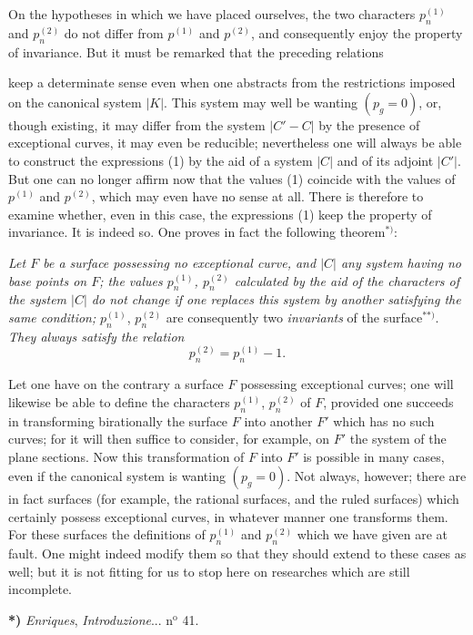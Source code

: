\documentclass{article}
\begin{document}
On the hypotheses in which we have placed ourselves, the two characters $p_{n}^{(1)}$ and $p_{n}^{(2)}$ do not differ from $p^{(1)}$ and $p^{(2)}$, and consequently enjoy the property of invariance. But it must be remarked that the preceding relations

keep a determinate sense even when one abstracts from the restrictions imposed on the canonical system $|K|$. This system may well be wanting $(p_{g} = 0)$, or, though existing, it may differ from the system $|C' - C|$ by the presence of exceptional curves, it may even be reducible; nevertheless one will always be able to construct the expressions (1) by the aid of a system $|C|$ and of its adjoint $|C'|$. But one can no longer affirm now that the values (1) coincide with the values of $p^{(1)}$ and $p^{(2)}$, which may even have no sense at all. There is therefore to examine whether, even in this case, the expressions (1) keep the property of invariance. It is indeed so. One proves in fact the following theorem${}^{*)}$:

\emph{Let $F$ be a surface possessing no exceptional curve, and $|C|$ any system having no base points on $F$; the values $p_{n}^{(1)}$, $p_{n}^{(2)}$ calculated by the aid of the characters of the system $|C|$ do not change if one replaces this system by another satisfying the same condition;} $p_{n}^{(1)}$, $p_{n}^{(2)}$ are consequently two \emph{invariants} of the surface${}^{**)}$. \emph{They always satisfy the relation}
\[
p_{n}^{(2)} = p_{n}^{(1)} - 1.
\]

Let one have on the contrary a surface $F$ possessing exceptional curves; one will likewise be able to define the characters $p_{n}^{(1)}$, $p_{n}^{(2)}$ of $F$, provided one succeeds in transforming birationally the surface $F$ into another $F'$ which has no such curves; for it will then suffice to consider, for example, on $F'$ the system of the plane sections. Now this transformation of $F$ into $F'$ is possible in many cases, even if the canonical system is wanting $(p_{g} = 0)$. Not always, however; there are in fact surfaces (for example, the rational surfaces, and the ruled surfaces) which certainly possess exceptional curves, in whatever manner one transforms them. For these surfaces the definitions of $p_{n}^{(1)}$ and $p_{n}^{(2)}$ which we have given are at fault. One might indeed modify them so that they should extend to these cases as well; but it is not fitting for us to stop here on researches which are still incomplete.

\textbf{*)} \emph{Enriques}, \emph{Introduzione}... n${}^{\text{o}}$ 41.
\end{document}
